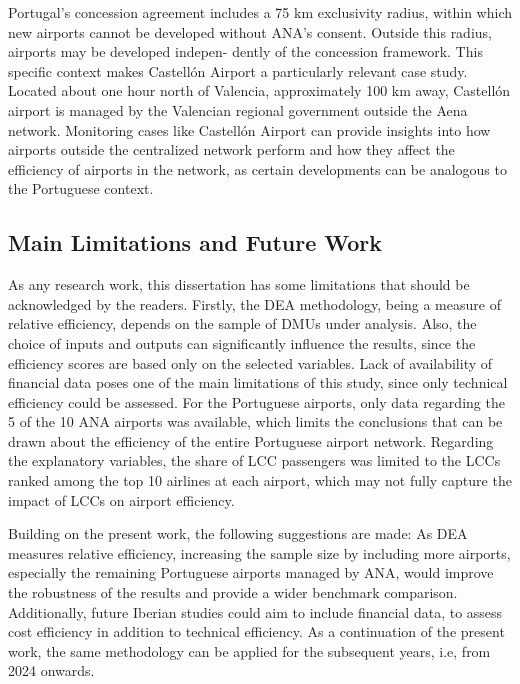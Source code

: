 Portugal’s concession agreement includes a 75 km exclusivity radius, within which new airports
cannot be developed without ANA’s consent. Outside this radius, airports may be developed indepen-
dently of the concession framework.
This specific context makes Castellón Airport a particularly relevant case study. Located about one
hour north of Valencia, approximately 100 km away, Castellón airport is managed by the Valencian
regional government outside the Aena network. Monitoring cases like Castellón Airport can provide insights
into how airports outside the centralized network perform and how they affect
the efficiency of airports in the network, as certain developments can be analogous to the Portuguese
context.

\subsection{Main Limitations and Future Work}
As any research work, this dissertation has some limitations that should be acknowledged by the
readers. Firstly, the DEA methodology, being a measure of relative efficiency, depends on the sample
of DMUs under analysis. Also, the choice of inputs and outputs can significantly influence the results,
since the efficiency scores are based only on the selected variables. Lack of availability of financial
data poses one of the main limitations of this study, since only technical efficiency could be assessed. For the Portuguese airports, only data regarding the 5 of the 10 ANA airports was
available, which limits the conclusions that can be drawn about the efficiency of the entire Portuguese
airport network. Regarding the explanatory variables, the share of LCC passengers was limited to the LCCs ranked
among the top 10 airlines at each airport, which may not fully capture the impact of LCCs on airport
efficiency.

Building on the present work, the following suggestions are made: As DEA measures relative efficiency, increasing the sample size by including more airports, especially the remaining Portuguese airports managed by ANA, would improve the robustness of the results and provide a wider benchmark comparison. Additionally, future Iberian studies could aim to include financial data, to assess cost
efficiency in addition to technical efficiency. As a continuation of the present work, the same methodology can be applied for the subsequent
years, i.e, from 2024 onwards.